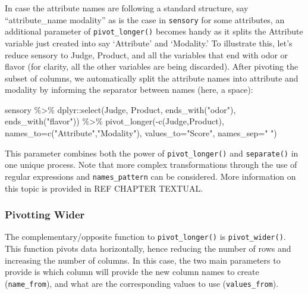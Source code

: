 \documentclass[
]{book}
\newenvironment{Shaded}{\begin{snugshade}}{\end{snugshade}}
\newcommand{\AttributeTok}[1]{\textcolor[rgb]{0.77,0.63,0.00}{#1}}
\newcommand{\FunctionTok}[1]{\textcolor[rgb]{0.00,0.00,0.00}{#1}}
\newcommand{\NormalTok}[1]{#1}
\newcommand{\SpecialCharTok}[1]{\textcolor[rgb]{0.00,0.00,0.00}{#1}}
\newcommand{\StringTok}[1]{\textcolor[rgb]{0.31,0.60,0.02}{#1}}
\begin{document}
In case the attribute names are following a standard structure, say ``attribute\_name modality'' as is the case in \texttt{sensory} for some attributes, an additional parameter of \texttt{pivot\_longer()} becomes handy as it splits the Attribute variable just created into say `Attribute' and `Modality.' To illustrate this, let's reduce sensory to Judge, Product, and all the variables that end with odor or flavor (for clarity, all the other variables are being discarded). After pivoting the subset of columns, we automatically split the attribute names into attribute and modality by informing the separator between names (here, a space):

\begin{Shaded}
\begin{Highlighting}[]
\NormalTok{sensory }\SpecialCharTok{\%\textgreater{}\%} 
\NormalTok{  dplyr}\SpecialCharTok{::}\FunctionTok{select}\NormalTok{(Judge, Product, }\FunctionTok{ends\_with}\NormalTok{(}\StringTok{"odor"}\NormalTok{), }\FunctionTok{ends\_with}\NormalTok{(}\StringTok{"flavor"}\NormalTok{)) }\SpecialCharTok{\%\textgreater{}\%} 
  \FunctionTok{pivot\_longer}\NormalTok{(}\SpecialCharTok{{-}}\FunctionTok{c}\NormalTok{(Judge,Product), }\AttributeTok{names\_to=}\FunctionTok{c}\NormalTok{(}\StringTok{"Attribute"}\NormalTok{,}\StringTok{"Modality"}\NormalTok{), }\AttributeTok{values\_to=}\StringTok{"Score"}\NormalTok{, }\AttributeTok{names\_sep=}\StringTok{" "}\NormalTok{)}
\end{Highlighting}
\end{Shaded}

This parameter combines both the power of \texttt{pivot\_longer()} and \texttt{separate()} in one unique process. Note that more complex transformations through the use of regular expressions and \texttt{names\_pattern} can be considered. More information on this topic is provided in REF CHAPTER TEXTUAL.

\hypertarget{pivotting-wider}{%
\subsubsection{Pivotting Wider}\label{pivotting-wider}}

The complementary/opposite function to \texttt{pivot\_longer()} is \texttt{pivot\_wider()}. This function pivots data horizontally, hence reducing the number of rows and increasing the number of columns. In this case, the two main parameters to provide is which column will provide the new column names to create (\texttt{name\_from}), and what are the corresponding values to use (\texttt{values\_from}).
\end{document}
